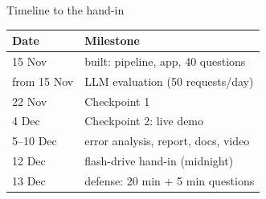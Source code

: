 \documentclass[12pt,aspectratio=169]{beamer}
\begin{document}
\begin{frame}{Timeline to the hand-in}
  \begin{tabular}{@{}ll@{}}
    \toprule
    Date & Milestone \\
    \midrule
    15 Nov & built: pipeline, app, 40 questions \\
    from 15 Nov & LLM evaluation (50 requests/day) \\
    22 Nov & Checkpoint 1 \\
    4 Dec & Checkpoint 2: live demo \\
    5--10 Dec & error analysis, report, docs, video \\
    12 Dec & flash-drive hand-in (midnight) \\
    13 Dec & defense: 20 min + 5 min questions \\
    \bottomrule
  \end{tabular}
\end{frame}
\end{document}
